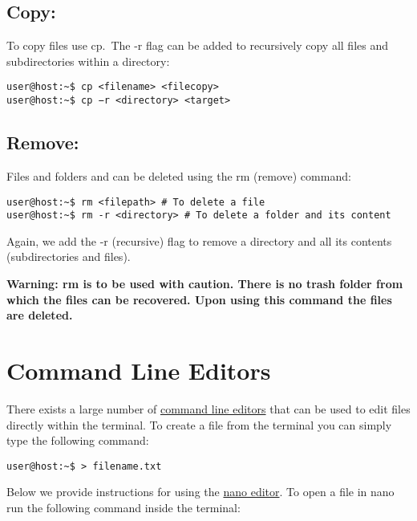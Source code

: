 \documentclass[
]{book}
\begin{document}
\hypertarget{copy}{%
\subsection{Copy:}\label{copy}}

To copy files use cp.~The -r flag can be added to recursively copy all files and subdirectories within a directory:

\begin{verbatim}
user@host:~$ cp <filename> <filecopy>
user@host:~$ cp −r <directory> <target>
\end{verbatim}

\hypertarget{remove}{%
\subsection{Remove:}\label{remove}}

Files and folders and can be deleted using the rm (remove) command:

\begin{verbatim}
user@host:~$ rm <filepath> # To delete a file
user@host:~$ rm -r <directory> # To delete a folder and its content
\end{verbatim}

Again, we add the -r (recursive) flag to remove a directory and all its contents (subdirectories and files).

\textbf{Warning: rm is to be used with caution. There is no trash folder
from which the files can be recovered. Upon using this command the files are deleted.}

\hypertarget{command-line-editors}{%
\section{Command Line Editors}\label{command-line-editors}}

There exists a large number of \href{https://en.wikipedia.org/wiki/List_of_text_editors}{command line editors}
that can be used to edit files directly within the terminal.
To create a file from the terminal you can simply type the following command:

\begin{verbatim}
user@host:~$ > filename.txt
\end{verbatim}

Below we provide instructions for using the
\href{https://www.nano-editor.org/}{nano editor}. To open a file in nano run the following command inside the
terminal:
\end{document}
